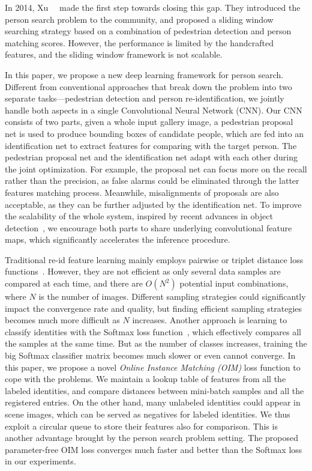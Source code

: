 In 2014, Xu~\etal~\cite{xu2014person} made the first step towards closing this gap. They introduced the person search problem to the community, and proposed a sliding window searching strategy based on a combination of pedestrian detection and person matching scores. However, the performance is limited by the handcrafted features, and the sliding window framework is not scalable.

In this paper, we propose a new deep learning framework for person search. Different from conventional approaches that break down the problem into two separate tasks---pedestrian detection and person re-identification, we jointly handle both aspects in a single Convolutional Neural Network (CNN). Our CNN consists of two parts, given a whole input gallery image, a pedestrian proposal net is used to produce bounding boxes of candidate people, which are fed into an identification net to extract features for comparing with the target person. The pedestrian proposal net and the identification net adapt with each other during the joint optimization. For example, the proposal net can focus more on the recall rather than the precision, as false alarms could be eliminated through the latter features matching process. Meanwhile, misalignments of proposals are also acceptable, as they can be further adjusted by the identification net. To improve the scalability of the whole system, inspired by recent advances in object detection~\cite{ren2015faster}, we encourage both parts to share underlying convolutional feature maps, which significantly accelerates the inference procedure.

Traditional re-id feature learning mainly employs pairwise or triplet distance loss functions~\cite{li2014deepreid,ahmed2015improved,cheng2016person,ding2015deep}. However, they are not efficient as only several data samples are compared at each time, and there are $O(N^2)$ potential input combinations, where $N$ is the number of images. Different sampling strategies could significantly impact the convergence rate and quality, but finding efficient sampling strategies becomes much more difficult as $N$ increases. Another approach is learning to classify identities with the Softmax loss function~\cite{xiao2016learning}, which effectively compares all the samples at the same time. But as the number of classes increases, training the big Softmax classifier matrix becomes much slower or even cannot converge. In this paper, we propose a novel \textit{Online Instance Matching (OIM)} loss function to cope with the problems. We maintain a lookup table of features from all the labeled identities, and compare distances between mini-batch samples and all the registered entries. On the other hand, many unlabeled identities could appear in scene images, which can be served as negatives for labeled identities. We thus exploit a circular queue to store their features also for comparison. This is another advantage brought by the person search problem setting. The proposed parameter-free OIM loss converges much faster and better than the Softmax loss in our experiments.

